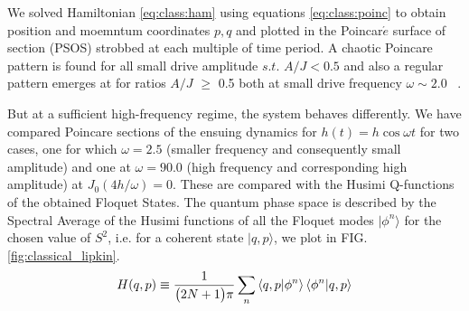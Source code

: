 \documentclass[%
reprint,
superscriptaddress,
amsmath,amssymb,
aps,
prb,
]{revtex4-2}
\begin{document}
	We solved Hamiltonian \ref{eq:class:ham} using equations \ref{eq:class:poinc} to obtain position and moemntum coordinates $p,q$ and plotted in the Poincar$\acute{e}$ surface of section (PSOS) strobbed at each multiple of time period. A chaotic Poincare pattern is found for all small drive amplitude $s.t.$  $A/J < 0.5 $ and also a regular pattern emerges at for ratios $A/J$ $\geq$ 0.5 both at small drive frequency $\omega \sim 2.0$ ~\cite{russomanno_thermalization_2015}. 
	
	But at a sufficient high-frequency regime, the system behaves differently. We have compared  Poincare sections of the ensuing dynamics for $h(t)=h\cos{\omega t}$ for two cases, one for which $\omega=2.5$ (smaller frequency and consequently small amplitude) and one at $\omega=90.0$ (high frequency and corresponding high amplitude) at $J_0(4h/\omega)=0$. These are compared with the Husimi Q-functions of the obtained Floquet States. The quantum phase space is described by the Spectral Average of the Husimi functions of all the Floquet modes $|\phi^n\rangle$ for the chosen value of $S^2$, i.e. for a coherent state $|q, p\rangle$, we plot in FIG. \ref{fig:classical_lipkin}.
	\begin{equation*}
		H(q,p)\equiv \frac{1}{\big(2N+1\big)\pi}\sum_n \ip{q,p}{\phi^n}\ip{\phi^n}{q,p}
	\end{equation*}
	
\end{document}
